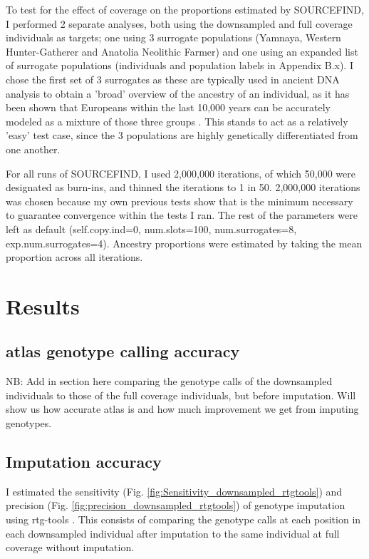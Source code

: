 To test for the effect of coverage on the proportions estimated by SOURCEFIND, I performed 2 separate analyses, both using the downsampled and full coverage individuals as targets; one using 3 surrogate populations (Yamnaya, Western Hunter-Gatherer and Anatolia Neolithic Farmer) and one using an expanded list of surrogate populations (individuals and population labels in Appendix B.x). I chose the first set of 3 surrogates as these are typically used in ancient DNA analysis to obtain a 'broad' overview of the ancestry of an individual, as it has been shown that Europeans within the last 10,000 years can be accurately modeled as a mixture of those three groups \cite{Lazaridis2014}. This stands to act as a relatively 'easy' test case, since the 3 populations are highly genetically differentiated from one another.

For all runs of SOURCEFIND, I used 2,000,000 iterations, of which 50,000 were designated as burn-ins, and thinned the iterations to 1 in 50. 2,000,000 iterations was chosen because my own previous tests show that is the minimum necessary to guarantee convergence within the tests I ran. The rest of the parameters were left as default (self.copy.ind=0, num.slots=100, num.surrogates=8, exp.num.surrogates=4). Ancestry proportions were estimated by taking the mean proportion across all iterations. 

\section{Results}

\subsection{atlas genotype calling accuracy}

NB: Add in section here comparing the genotype calls of the downsampled individuals to those of the full coverage individuals, but before imputation. Will show us how accurate atlas is and how much improvement we get from imputing genotypes.  

\subsection{Imputation accuracy}

I estimated the sensitivity (Fig. \ref{fig:Sensitivity_downsampled_rtgtools}) and precision (Fig.  \ref{fig:precision_downsampled_rtgtools}) of genotype imputation using rtg-tools \cite{cleary2014joint}. This consists of comparing the genotype calls at each position in each downsampled individual after imputation to the same individual at full coverage without imputation.

